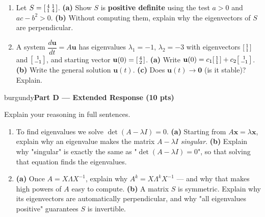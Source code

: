 \documentclass[10pt]{article}
\newcommand{\xx}{\mathbf{x}}
\newcommand{\uu}{\mathbf{u}}
\newcommand{\parthead}[1]{%
  \vspace{6pt}\noindent
  \begin{headlinebox}{burgundy}{\color{white}\bfseries #1}\end{headlinebox}%
  \vspace{4pt}}
\begin{document}
\begin{enumerate}[leftmargin=1.9em, itemsep=12pt]
        \textbf{(b)} $Q=\begin{bsmallmatrix}3&1\\1&3\end{bsmallmatrix}$.
        \vspace{2.6cm}
  \item Let $S=\begin{bsmallmatrix}4&1\\1&4\end{bsmallmatrix}$.
        \textbf{(a)} Show $S$ is \textbf{positive definite} using the test $a>0$ and $ac-b^2>0$.
        \textbf{(b)} Without computing them, explain why the eigenvectors of $S$ are perpendicular.
        \vspace{2.4cm}
  \item A system $\dfrac{d\uu}{dt}=A\uu$ has eigenvalues $\lambda_1=-1$, $\lambda_2=-3$ with eigenvectors
        $\begin{bsmallmatrix}1\\1\end{bsmallmatrix}$ and $\begin{bsmallmatrix}1\\-1\end{bsmallmatrix}$, and starting
        vector $\uu(0)=\begin{bsmallmatrix}4\\2\end{bsmallmatrix}$.
        \textbf{(a)} Write $\uu(0)=c_1\begin{bsmallmatrix}1\\1\end{bsmallmatrix}+c_2\begin{bsmallmatrix}1\\-1\end{bsmallmatrix}$.
        \textbf{(b)} Write the general solution $\uu(t)$. \textbf{(c)} Does $\uu(t)\to\mathbf{0}$ (is it stable)? Explain.
        \vspace{3.0cm}
\end{enumerate}

\parthead{Part D --- Extended Response (10 pts)}
Explain your reasoning in full sentences.

\begin{enumerate}[leftmargin=1.9em, itemsep=16pt]
  \item To find eigenvalues we solve $\det(A-\lambda I)=0$.
        \textbf{(a)} Starting from $A\xx=\lambda\xx$, explain why an eigenvalue makes the matrix $A-\lambda I$
        \emph{singular}. \textbf{(b)} Explain why "singular" is exactly the same as "$\det(A-\lambda I)=0$", so
        that solving that equation finds the eigenvalues.
        \vspace{3.0cm}
  \item \textbf{(a)} Once $A=X\Lambda X^{-1}$, explain why $A^k=X\Lambda^k X^{-1}$ --- and why that makes high
        powers of $A$ easy to compute. \textbf{(b)} A matrix $S$ is symmetric. Explain why its eigenvectors are
        automatically perpendicular, and why "all eigenvalues positive" guarantees $S$ is invertible.
        \vspace{2.8cm}
\end{enumerate}
\end{document}

